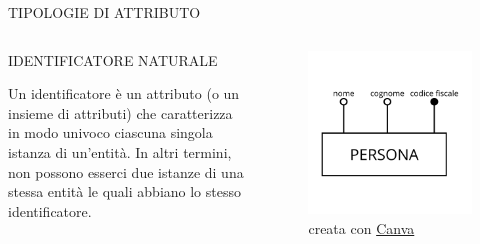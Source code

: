 \documentclass[aspectratio=1610]{beamer}
\begin{document}
\begin{frame}{TIPOLOGIE DI ATTRIBUTO}
    \begin{columns}
            \begin{alertblock}{IDENTIFICATORE NATURALE}
                \begin{minipage}{0.96\linewidth}
                    \justifying
                    Un identificatore è un attributo (o un insieme di attributi) che caratterizza 
                    in modo univoco ciascuna singola istanza di un’entità. In altri termini, 
                    non possono esserci due istanze di una stessa entità le quali abbiano lo 
                    stesso identificatore.\\
                    \bigskip
                \end{minipage}
            \end{alertblock}
            \begin{figure}
                \includegraphics[width=\linewidth]{img/id_naturale.png}
                \caption{{creata con \href{www.canva.com}{Canva}}}
            \end{figure}
    \end{columns}
\end{frame}
\end{document}
